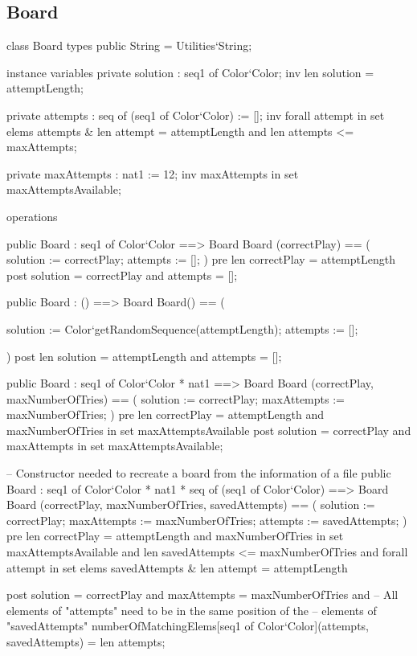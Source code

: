 \documentclass{article}
\begin{document}
\subsection{Board}
\begin{vdm_al}
class Board
  types
    public String = Utilities`String;

  instance variables
    private solution : seq1 of Color`Color;
    inv len solution = attemptLength;

    private attempts : seq of (seq1 of Color`Color) := [];
    inv forall attempt in set elems attempts & len attempt = attemptLength and
      len attempts <= maxAttempts;

    private maxAttempts : nat1 := 12;
    inv maxAttempts in set maxAttemptsAvailable;


  operations


    public Board : seq1 of Color`Color ==> Board
    Board (correctPlay) == (
      solution := correctPlay;
      attempts := [];
    )
    pre len correctPlay = attemptLength
    post solution = correctPlay and
      attempts = [];


    public Board : () ==> Board
    Board() == (

      solution := Color`getRandomSequence(attemptLength);
      attempts := [];

    )
    post len solution = attemptLength and attempts = [];


    public Board : seq1 of Color`Color * nat1 ==> Board
    Board (correctPlay, maxNumberOfTries) == (
      solution := correctPlay;
      maxAttempts := maxNumberOfTries;
    )
    pre len correctPlay = attemptLength and
      maxNumberOfTries in set maxAttemptsAvailable
    post solution = correctPlay and
      maxAttempts in set maxAttemptsAvailable;


    -- Constructor needed to recreate a board from the information of a file
    public Board : seq1 of Color`Color * nat1 * seq of (seq1 of Color`Color) ==> Board
    Board (correctPlay, maxNumberOfTries, savedAttempts) == (
      solution := correctPlay;
      maxAttempts := maxNumberOfTries;
      attempts := savedAttempts;
    )
    pre len correctPlay = attemptLength and
      maxNumberOfTries in set maxAttemptsAvailable and
      len savedAttempts <= maxNumberOfTries and
      forall attempt in set elems savedAttempts & len attempt = attemptLength

    post solution = correctPlay and
      maxAttempts = maxNumberOfTries and
      -- All elements of "attempts" need to be in the same position of the
      -- elements of "savedAttempts"
      numberOfMatchingElems[seq1 of Color`Color](attempts, savedAttempts) = len attempts;




\end{vdm_al}
\end{document}
